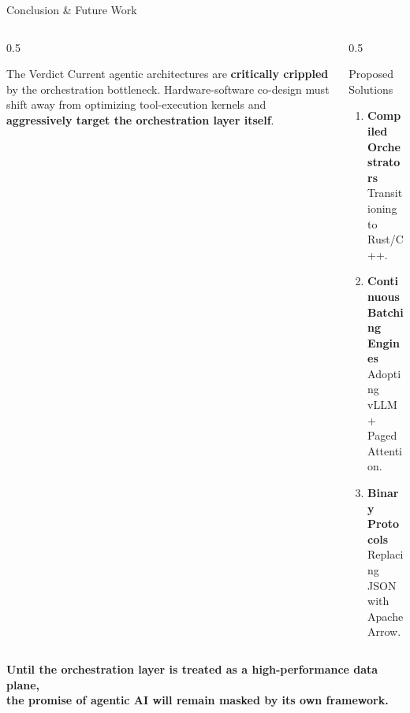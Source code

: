 \documentclass[aspectratio=169, 10pt]{beamer}
\begin{document}
\begin{frame}{Conclusion \& Future Work}
  \begin{columns}
    \begin{column}{0.5\textwidth}
      \begin{exampleblock}{The Verdict}
        Current agentic architectures are \textbf{critically crippled} by the orchestration bottleneck. Hardware-software co-design must shift away from optimizing tool-execution kernels and \textbf{aggressively target the orchestration layer itself}.
      \end{exampleblock}
    \end{column}
    \begin{column}{0.5\textwidth}
      \begin{block}{Proposed Solutions}
        \begin{enumerate}
          \item \textcolor{neonmint}{\textbf{Compiled Orchestrators}}\\
                {\small Transitioning to Rust/C++.}
          \item \textcolor{neonviolet}{\textbf{Continuous Batching Engines}}\\
                {\small Adopting vLLM + PagedAttention.}
          \item \textcolor{neonpink}{\textbf{Binary Protocols}}\\
                {\small Replacing JSON with Apache Arrow.}
        \end{enumerate}
      \end{block}
    \end{column}
  \end{columns}
  \vspace{0.6em}
  \begin{center}
    \textcolor{neonmint}{\textbf{Until the orchestration layer is treated as a high-performance data plane,\\
    the promise of agentic AI will remain masked by its own framework.}}
  \end{center}
\end{frame}
\end{document}
